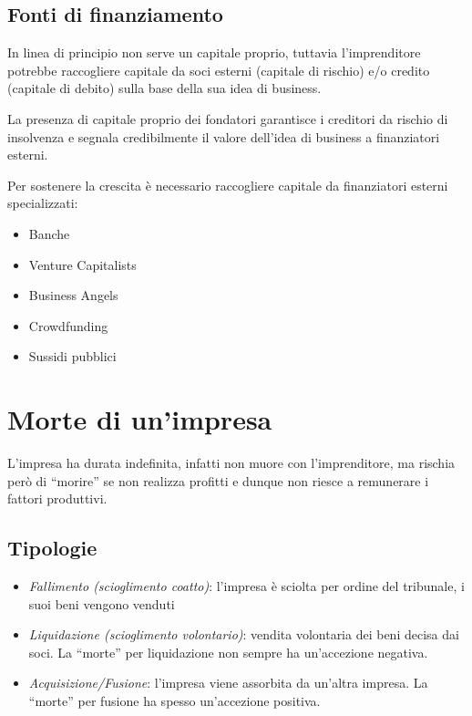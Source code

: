 \documentclass[10pt,a4paper,fleqn,oneside]{book}
\begin{document}
\subsection{Fonti di finanziamento}

In linea di principio non serve un capitale proprio, tuttavia l’imprenditore
potrebbe raccogliere capitale da soci esterni (capitale di rischio) e/o credito
(capitale di debito) sulla base della sua idea di business.

La presenza di capitale proprio dei fondatori garantisce i creditori
da rischio di insolvenza e segnala credibilmente il valore dell’idea di
business a finanziatori esterni.

Per sostenere la crescita è necessario raccogliere capitale da finanziatori
esterni specializzati:
\begin{itemize}
    \item Banche
    \item Venture Capitalists
    \item Business Angels
    \item Crowdfunding
    \item Sussidi pubblici
\end{itemize}

\section{Morte di un'impresa}
L’impresa ha durata indefinita, infatti non muore con l’imprenditore, ma
rischia però di ``morire'' se non realizza profitti e dunque non riesce a
remunerare i fattori produttivi.

\subsection{Tipologie}

\begin{itemize}
    \item \emph{Fallimento (scioglimento coatto)}: l’impresa è sciolta per
    ordine del tribunale, i suoi beni vengono venduti
    \item \emph{Liquidazione (scioglimento volontario)}: vendita volontaria dei beni decisa dai
    soci. La ``morte'' per liquidazione non sempre ha un’accezione negativa.
    \item \emph{Acquisizione/Fusione}: l’impresa viene assorbita da un'altra
    impresa. La ``morte'' per fusione ha spesso un'accezione positiva.
\end{itemize}
\end{document}
